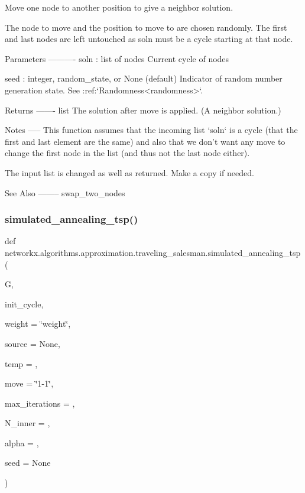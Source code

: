 \begin{DoxyVerb}Move one node to another position to give a neighbor solution.

The node to move and the position to move to are chosen randomly.
The first and last nodes are left untouched as soln must be a cycle
starting at that node.

Parameters
----------
soln : list of nodes
    Current cycle of nodes

seed : integer, random_state, or None (default)
    Indicator of random number generation state.
    See :ref:`Randomness<randomness>`.

Returns
-------
list
    The solution after move is applied. (A neighbor solution.)

Notes
-----
    This function assumes that the incoming list `soln` is a cycle
    (that the first and last element are the same) and also that
    we don't want any move to change the first node in the list
    (and thus not the last node either).

    The input list is changed as well as returned. Make a copy if needed.

See Also
--------
    swap_two_nodes
\end{DoxyVerb}
 \mbox{\label{namespacenetworkx_1_1algorithms_1_1approximation_1_1traveling__salesman_afbaf80a5dab2307652409b12bf33ca72}} 
\subsubsection{\texorpdfstring{simulated\+\_\+annealing\+\_\+tsp()}{simulated\_annealing\_tsp()}}
{\footnotesize\ttfamily def networkx.\+algorithms.\+approximation.\+traveling\+\_\+salesman.\+simulated\+\_\+annealing\+\_\+tsp (\begin{DoxyParamCaption}\item[{}]{G,  }\item[{}]{init\+\_\+cycle,  }\item[{}]{weight = {\ttfamily \char`\"{}weight\char`\"{}},  }\item[{}]{source = {\ttfamily None},  }\item[{}]{temp = {},  }\item[{}]{move = {\ttfamily \char`\"{}1-\/1\char`\"{}},  }\item[{}]{max\+\_\+iterations = {},  }\item[{}]{N\+\_\+inner = {},  }\item[{}]{alpha = {},  }\item[{}]{seed = {\ttfamily None} }\end{DoxyParamCaption})}

